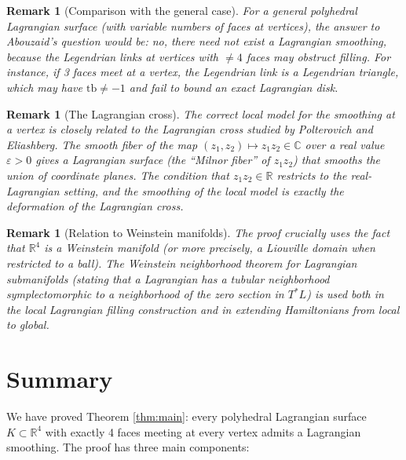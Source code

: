 \documentclass[12pt]{article}
\newtheorem{remark}[theorem]{Remark}
\newcommand{\bR}{\mathbb{R}}
\newcommand{\bC}{\mathbb{C}}
\newcommand{\eps}{\varepsilon}
\begin{document}
\begin{remark}[Comparison with the general case]
For a general polyhedral Lagrangian surface (with variable numbers of faces at vertices), the answer to Abouzaid's question would be: no, there need not exist a Lagrangian smoothing, because the Legendrian links at vertices with $\neq 4$ faces may obstruct filling. For instance, if 3 faces meet at a vertex, the Legendrian link is a Legendrian triangle, which may have $\mathrm{tb} \neq -1$ and fail to bound an exact Lagrangian disk.
\end{remark}

\begin{remark}[The Lagrangian cross]
The correct local model for the smoothing at a vertex is closely related to the \emph{Lagrangian cross} studied by Polterovich and Eliashberg. The smooth fiber of the map $(z_1, z_2) \mapsto z_1 z_2 \in \bC$ over a real value $\eps > 0$ gives a Lagrangian surface (the ``Milnor fiber'' of $z_1 z_2$) that smooths the union of coordinate planes. The condition that $z_1 z_2 \in \bR$ restricts to the real-Lagrangian setting, and the smoothing of the local model is exactly the deformation of the Lagrangian cross.
\end{remark}

\begin{remark}[Relation to Weinstein manifolds]
The proof crucially uses the fact that $\bR^4$ is a Weinstein manifold (or more precisely, a Liouville domain when restricted to a ball). The Weinstein neighborhood theorem for Lagrangian submanifolds (stating that a Lagrangian has a tubular neighborhood symplectomorphic to a neighborhood of the zero section in $T^*L$) is used both in the local Lagrangian filling construction and in extending Hamiltonians from local to global.
\end{remark}

\section{Summary}

We have proved Theorem \ref{thm:main}: every polyhedral Lagrangian surface $K \subset \bR^4$ with exactly 4 faces meeting at every vertex admits a Lagrangian smoothing. The proof has three main components:
\end{document}
